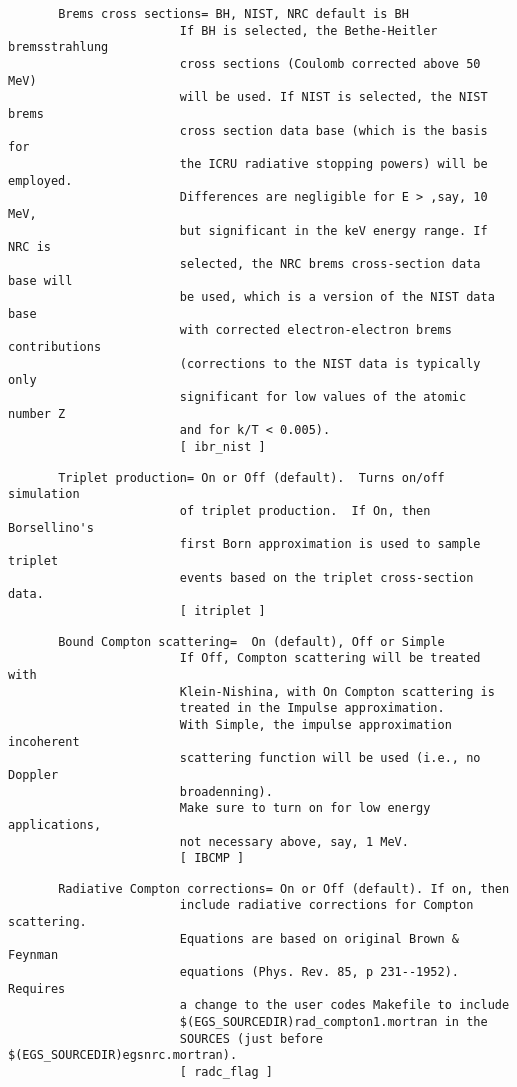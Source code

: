 \begin{verbatim}
       Brems cross sections= BH, NIST, NRC default is BH
                        If BH is selected, the Bethe-Heitler bremsstrahlung
                        cross sections (Coulomb corrected above 50 MeV)
                        will be used. If NIST is selected, the NIST brems
                        cross section data base (which is the basis for 
                        the ICRU radiative stopping powers) will be employed.
                        Differences are negligible for E > ,say, 10 MeV,
                        but significant in the keV energy range. If NRC is
                        selected, the NRC brems cross-section data base will
                        be used, which is a version of the NIST data base
                        with corrected electron-electron brems contributions
                        (corrections to the NIST data is typically only
                        significant for low values of the atomic number Z 
                        and for k/T < 0.005). 
                        [ ibr_nist ]
\end{verbatim}
\begin{verbatim}
       Triplet production= On or Off (default).  Turns on/off simulation
                        of triplet production.  If On, then Borsellino's
                        first Born approximation is used to sample triplet
                        events based on the triplet cross-section data.
                        [ itriplet ]
\end{verbatim}
\begin{verbatim}
       Bound Compton scattering=  On (default), Off or Simple
                        If Off, Compton scattering will be treated with
                        Klein-Nishina, with On Compton scattering is
                        treated in the Impulse approximation. 
                        With Simple, the impulse approximation incoherent 
                        scattering function will be used (i.e., no Doppler
                        broadenning). 
                        Make sure to turn on for low energy applications,
                        not necessary above, say, 1 MeV.
                        [ IBCMP ]
\end{verbatim}
\begin{verbatim}
       Radiative Compton corrections= On or Off (default). If on, then
                        include radiative corrections for Compton scattering.
                        Equations are based on original Brown & Feynman
                        equations (Phys. Rev. 85, p 231--1952).  Requires
                        a change to the user codes Makefile to include
                        $(EGS_SOURCEDIR)rad_compton1.mortran in the 
                        SOURCES (just before $(EGS_SOURCEDIR)egsnrc.mortran).
                        [ radc_flag ]
\end{verbatim}

